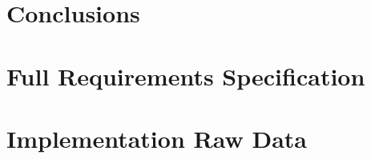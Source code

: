 \documentclass[11pt, a4paper, openright]{report}
\begin{document}
\chapter{Conclusions}
\label{c:conclusions}
%
\endgroup



\begin{appendices}
\chapter{Full Requirements Specification}


\chapter{Implementation Raw Data}

	
\end{appendices}
\end{document}
